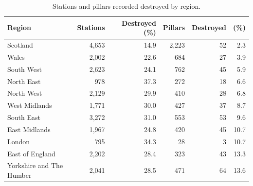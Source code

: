\documentclass[11pt,a4paper]{article}
\begin{document}
\begin{table}[tbp]\centering\small\caption{Stations and pillars recorded destroyed by region.}\label{tab:region}\begin{tabular}{lrrrrr}\toprule Region & Stations & Destroyed (\%) & Pillars & Destroyed & (\%)\\\midrule
Scotland & 4,653 & 14.9 & 2,223 & 52 & 2.3\\
Wales & 2,002 & 22.6 & 684 & 27 & 3.9\\
South West & 2,623 & 24.1 & 762 & 45 & 5.9\\
North East & 978 & 37.3 & 272 & 18 & 6.6\\
North West & 2,129 & 29.9 & 410 & 28 & 6.8\\
West Midlands & 1,771 & 30.0 & 427 & 37 & 8.7\\
South East & 3,272 & 31.0 & 553 & 53 & 9.6\\
East Midlands & 1,967 & 24.8 & 420 & 45 & 10.7\\
London & 795 & 34.3 & 28 & 3 & 10.7\\
East of England & 2,202 & 28.4 & 323 & 43 & 13.3\\
Yorkshire and The Humber & 2,041 & 28.5 & 471 & 64 & 13.6\\
\bottomrule\end{tabular}\end{table}
\end{document}
